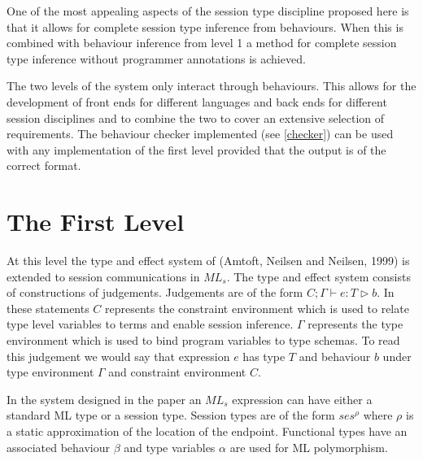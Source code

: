 One of the most appealing aspects of the session type discipline proposed here is that it allows for complete session type inference from behaviours. When this is combined with behaviour inference from level 1 a method for complete session type inference without programmer annotations is achieved. 

The two levels of the system only interact through behaviours. This allows for the development of front ends for different languages and back ends for different session disciplines and to combine the two to cover an extensive selection of requirements. The behaviour checker implemented (see \ref{checker}) can be used with any implementation of the first level provided that the output is of the correct format.

\section{The First Level} \label{level1}

At this level the type and effect system of (Amtoft, Neilsen and Neilsen, 1999) \cite{amtoft} is extended to session communications in $ML_s$. The type and effect system consists of constructions of judgements. Judgements are of the form $C;\Gamma \vdash e : T \triangleright b$. In these statements $C$ represents the constraint environment which is used to relate type level variables to terms and enable session inference. $\Gamma$ represents the type environment which is used to bind program variables to type schemas. To read this judgement we would say that expression $e$ has type $T$ and behaviour $b$ under type environment $\Gamma$ and constraint environment $C$.

In the system designed in the paper an $ML_s$ expression can have either a standard ML type or a session type. Session types are of the form $ses^\rho$ where $\rho$ is a static approximation of the location of the endpoint. Functional types have an associated behaviour $\beta$ and type variables $\alpha$ are used for ML polymorphism. 

